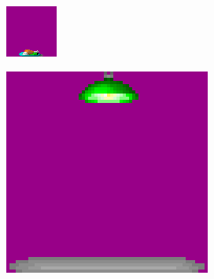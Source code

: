   \begin{minipage}{.5\textwidth} 
     \includegraphics[width=\textwidth]{imgs/sprite_food.png} 
   \end{minipage}
  \begin{minipage}{.5\textwidth} 
     \includegraphics[width=\textwidth]{imgs/light_sprite.png}
   \end{minipage}

